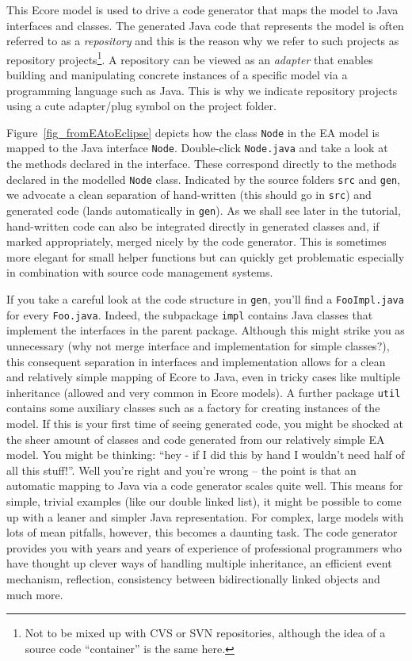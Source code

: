 This Ecore model is used to drive a code generator that maps the model to Java interfaces and classes.  
The generated Java code that represents the model is often referred to as a \emph{repository} and this is the reason why we refer to such projects as repository projects\footnote{Not to be mixed up with CVS or SVN repositories, although the idea of a source code ``container'' is the same here.}. 
A repository can be viewed as an \emph{adapter} that enables building and manipulating concrete instances of a specific model via a programming language such as Java.  
This is why we indicate repository projects using a cute adapter/plug symbol on the project folder.  

Figure~\ref{fig_fromEAtoEclipse} depicts how the class \texttt{Node} in the EA model is mapped to the Java interface \texttt{Node}.  
Double-click \texttt{Node.java} and take a look at the methods declared in the interface.
These correspond directly to the methods declared in the modelled \texttt{Node} class.  
Indicated by the source folders \texttt{src} and \texttt{gen}, we advocate a clean separation of hand-written (this should go in \texttt{src}) and generated code (lands automatically in \texttt{gen}).  
As we shall see later in the tutorial, hand-written code can also be integrated directly in generated classes and, if marked appropriately, merged nicely by the code generator. 
This is sometimes more elegant for small helper functions but can quickly get problematic especially in combination with source code management systems.

If you take a careful look at the code structure in \texttt{gen}, you'll find a \texttt{Foo\-Impl.java} for every \texttt{Foo.java}. 
Indeed, the subpackage \texttt{impl} contains Java classes that implement the interfaces in the parent package.  
Although this might strike you as unnecessary (why not merge interface and implementation for simple classes?), this consequent separation in interfaces and implementation allows for a clean and relatively simple mapping of Ecore to Java, even in tricky cases like multiple inheritance (allowed and very common in Ecore models).  
A further package \texttt{util} contains some auxiliary classes such as a factory for creating instances of the model.  
If this is your first time of seeing generated code, you might be shocked at the sheer amount of classes and code generated from our relatively simple EA model.  
You might be thinking: ``hey - if I did this by hand I wouldn't need half of all this stuff!''.  
Well you're right and you're wrong -- the point is that an automatic mapping to Java via a code generator scales quite well.
This means for simple, trivial examples (like our double linked list), it might be possible to come up with a leaner and simpler Java representation.  
For complex, large models with lots of mean pitfalls, however, this becomes a daunting task.  
The code generator provides you with years and years of experience of professional programmers who have thought up clever ways of handling multiple inheritance, an efficient event mechanism, reflection, consistency between bidirectionally linked objects and much more.

